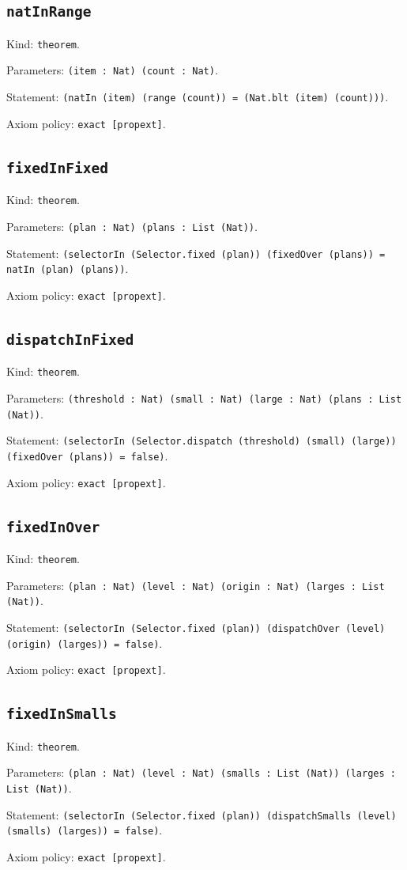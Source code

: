 \documentclass[11pt]{article}
\begin{document}
\subsection*{\texttt{natInRange}}
\noindent Kind: \texttt{theorem}.\par
\noindent Parameters: \texttt{(item : Nat) (count : Nat)}.\par
\noindent Statement: \texttt{(natIn (item) (range (count)) = (Nat.blt (item) (count)))}.\par
\noindent Axiom policy: \texttt{exact [propext]}.\par
\subsection*{\texttt{fixedInFixed}}
\noindent Kind: \texttt{theorem}.\par
\noindent Parameters: \texttt{(plan : Nat) (plans : List (Nat))}.\par
\noindent Statement: \texttt{(selectorIn (Selector.fixed (plan)) (fixedOver (plans)) = natIn (plan) (plans))}.\par
\noindent Axiom policy: \texttt{exact [propext]}.\par
\subsection*{\texttt{dispatchInFixed}}
\noindent Kind: \texttt{theorem}.\par
\noindent Parameters: \texttt{(threshold : Nat) (small : Nat) (large : Nat) (plans : List (Nat))}.\par
\noindent Statement: \texttt{(selectorIn (Selector.dispatch (threshold) (small) (large)) (fixedOver (plans)) = false)}.\par
\noindent Axiom policy: \texttt{exact [propext]}.\par
\subsection*{\texttt{fixedInOver}}
\noindent Kind: \texttt{theorem}.\par
\noindent Parameters: \texttt{(plan : Nat) (level : Nat) (origin : Nat) (larges : List (Nat))}.\par
\noindent Statement: \texttt{(selectorIn (Selector.fixed (plan)) (dispatchOver (level) (origin) (larges)) = false)}.\par
\noindent Axiom policy: \texttt{exact [propext]}.\par
\subsection*{\texttt{fixedInSmalls}}
\noindent Kind: \texttt{theorem}.\par
\noindent Parameters: \texttt{(plan : Nat) (level : Nat) (smalls : List (Nat)) (larges : List (Nat))}.\par
\noindent Statement: \texttt{(selectorIn (Selector.fixed (plan)) (dispatchSmalls (level) (smalls) (larges)) = false)}.\par
\noindent Axiom policy: \texttt{exact [propext]}.\par
\end{document}
